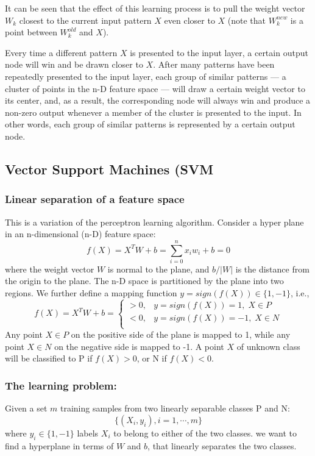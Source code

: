 It can be seen that the effect of this learning process is to pull the weight
vector $W_k$ closest to the current input pattern $X$ even closer to $X$
(note that $W_k^{new}$ is a point between $W_k^{old}$ and $X$).

Every time a different pattern $X$ is presented to the input layer, a certain
output node will win and be drawn closer to $X$. After many patterns have been
repeatedly presented to the input layer, each group of similar patterns --- a 
cluster of points in the n-D feature space --- will draw a certain weight 
vector to its center, and, as a result, the corresponding node will always win
and produce a non-zero output whenever a member of the cluster is presented to
the input. In other words, each group of similar patterns is represented by a
certain output node.


\newpage
\subsection*{Vector Support Machines (SVM}

\subsubsection*{Linear separation of a feature space}

This is a variation of the perceptron learning algorithm.
Consider a hyper plane in an n-dimensional (n-D) feature space:
\[ f(X)=X^T W+b=\sum_{i=0}^n x_i w_i+b=0	\]
where the weight vector $W$ is normal to the plane, and $b/|W|$ is the 
distance from the origin to the plane. The n-D space is partitioned by the 
plane into two regions. We further define a mapping function $y=sign(f(X)) 
\in \{1,-1\}$, i.e.,
\[ f(X)=X^T W+b=\left\{ \begin{array}{ll} >0, &  y=sign(f(X))=1,\;X\in P  \\
					  <0, &  y=sign(f(X))=-1,\;X\in N \\
	\end{array} \right. \]
Any point $X\in P$ on the positive side of the plane is mapped to 1, while
any point $X\in N$ on the negative side is mapped to -1. A point $X$ of 
unknown class will be classified to P if $f(X)>0$, or N if $f(X)<0$.

\subsubsection*{The learning problem:}

Given a set $m$ training samples from two linearly separable classes P and N:
\[	\{ (X_i, y_i), i=1,\cdots,m \}	\]
where $y_i \in \{1,-1\}$ labels $X_i$ to belong to either of the two classes.
we want to find a hyperplane in terms of $W$ and $b$, that linearly separates
the two classes.

